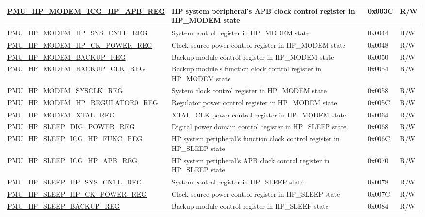 \begin{longtable}{ | l | p{6cm} | p{1.3cm} | p{1.5cm} | }
\hyperref[regdesc:PMUHPMODEMICGHPAPBREG]{PMU\_HP\_MODEM\_ICG\_HP\_APB\_REG} & HP system peripheral's APB clock control register in HP\_MODEM state  & 0x003C & R/W \\ \hline
\hyperref[regdesc:PMUHPMODEMHPSYSCNTLREG]{PMU\_HP\_MODEM\_HP\_SYS\_CNTL\_REG} & System control register in HP\_MODEM state  & 0x0044 & R/W \\ \hline
\hyperref[regdesc:PMUHPMODEMHPCKPOWERREG]{PMU\_HP\_MODEM\_HP\_CK\_POWER\_REG} & Clock source power control register in HP\_MODEM state  & 0x0048 & R/W \\ \hline
\hyperref[regdesc:PMUHPMODEMBACKUPREG]{PMU\_HP\_MODEM\_BACKUP\_REG} & Backup module control register in HP\_MODEM state  & 0x0050 & R/W \\ \hline
\hyperref[regdesc:PMUHPMODEMBACKUPCLKREG]{PMU\_HP\_MODEM\_BACKUP\_CLK\_REG} & Backup module's function clock control register in HP\_MODEM state  & 0x0054 & R/W \\ \hline
\hyperref[regdesc:PMUHPMODEMSYSCLKREG]{PMU\_HP\_MODEM\_SYSCLK\_REG} & System clock control register in HP\_MODEM state  & 0x0058 & R/W \\ \hline
\hyperref[regdesc:PMUHPMODEMHPREGULATOR0REG]{PMU\_HP\_MODEM\_HP\_REGULATOR0\_REG} & Regulator power control register in HP\_MODEM state  & 0x005C & R/W \\ \hline
\hyperref[regdesc:PMUHPMODEMXTALREG]{PMU\_HP\_MODEM\_XTAL\_REG} & XTAL\_CLK power control register in HP\_MODEM state  & 0x0064 & R/W \\ \hline
\hyperref[regdesc:PMUHPSLEEPDIGPOWERREG]{PMU\_HP\_SLEEP\_DIG\_POWER\_REG} & Digital power domain control register in HP\_SLEEP state & 0x0068 & R/W \\ \hline
\hyperref[regdesc:PMUHPSLEEPICGHPFUNCREG]{PMU\_HP\_SLEEP\_ICG\_HP\_FUNC\_REG} & HP system peripheral's function clock control register in HP\_SLEEP state & 0x006C & R/W \\ \hline
\hyperref[regdesc:PMUHPSLEEPICGHPAPBREG]{PMU\_HP\_SLEEP\_ICG\_HP\_APB\_REG} & HP system peripheral's APB clock control register in HP\_SLEEP state & 0x0070 & R/W \\ \hline
\hyperref[regdesc:PMUHPSLEEPHPSYSCNTLREG]{PMU\_HP\_SLEEP\_HP\_SYS\_CNTL\_REG} & System control register in HP\_SLEEP state & 0x0078 & R/W \\ \hline
\hyperref[regdesc:PMUHPSLEEPHPCKPOWERREG]{PMU\_HP\_SLEEP\_HP\_CK\_POWER\_REG} &  Clock source power control register in HP\_SLEEP state & 0x007C & R/W \\ \hline
\hyperref[regdesc:PMUHPSLEEPBACKUPREG]{PMU\_HP\_SLEEP\_BACKUP\_REG} & Backup module control register in HP\_SLEEP state & 0x0084 & R/W \\ \hline

\end{longtable}
